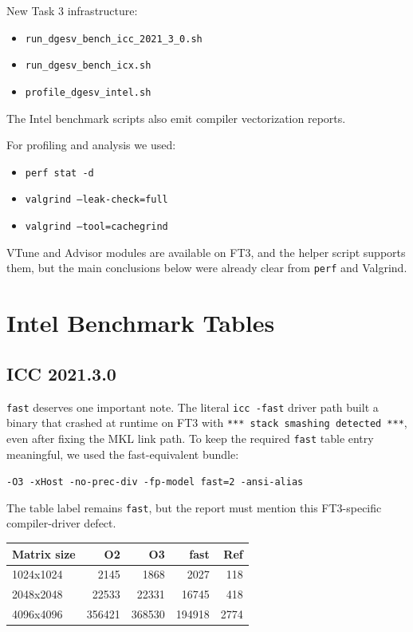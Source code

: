 \documentclass[11pt,a4paper]{article}
\begin{document}
New Task 3 infrastructure:

\begin{itemize}
\item \texttt{run\_dgesv\_bench\_icc\_2021\_3\_0.sh}
\item \texttt{run\_dgesv\_bench\_icx.sh}
\item \texttt{profile\_dgesv\_intel.sh}
\end{itemize}

The Intel benchmark scripts also emit compiler vectorization reports.

For profiling and analysis we used:

\begin{itemize}
\item \texttt{perf stat -d}
\item \texttt{valgrind --leak-check=full}
\item \texttt{valgrind --tool=cachegrind}
\end{itemize}

VTune and Advisor modules are available on FT3, and the helper script supports
them, but the main conclusions below were already clear from \texttt{perf} and
Valgrind.

\section{Intel Benchmark Tables}

\subsection{ICC 2021.3.0}

\texttt{fast} deserves one important note. The literal \texttt{icc -fast}
driver path built a binary that crashed at runtime on FT3 with
\texttt{*** stack smashing detected ***}, even after fixing the MKL link path.
To keep the required \texttt{fast} table entry meaningful, we used the
fast-equivalent bundle:

\begin{center}
\texttt{-O3 -xHost -no-prec-div -fp-model fast=2 -ansi-alias}
\end{center}

The table label remains \texttt{fast}, but the report must mention this
FT3-specific compiler-driver defect.

\begin{table}[h]
\centering
\begin{tabular}{lrrrr}
\toprule
Matrix size & O2 & O3 & fast & Ref \\
\midrule
1024x1024 & 2145 & 1868 & 2027 & 118 \\
2048x2048 & 22533 & 22331 & 16745 & 418 \\
4096x4096 & 356421 & 368530 & 194918 & 2774 \\
\bottomrule
\end{tabular}
\end{table}
\end{document}
